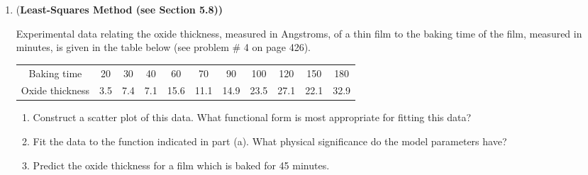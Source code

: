 \documentclass [12pt]{article}
\begin{document}
\begin{enumerate}
\item {(\bf Least-Squares Method (see Section 5.8))}

Experimental data relating the oxide thickness, measured in Angstroms, of a thin film to the baking time of the film, measured in minutes, is given in the table below (see problem \# 4 on page 426).

\medskip

\begin{tabular}{ccccccccccc}
\hspace*{-50pt}Baking time & 20 & 30 & 40 & 60 & 70 & 90 & 100 & 120 & 150 & 180 \\[5pt]
\hspace*{-32pt}Oxide thickness & 3.5 & 7.4 & 7.1 & 15.6 & 11.1 & 14.9 & 23.5 & 27.1 & 22.1 & 32.9
\end{tabular}
%
\medskip

\begin{enumerate}

\item Construct a scatter plot of this data. What functional form is most appropriate for fitting this data?

\item Fit the data to the function indicated in part (a). What physical significance do the model parameters have?

\item Predict the oxide thickness for a film which is baked for 45 minutes.
\end{enumerate}


%
%

\medskip


\end{enumerate}
\end{document}
